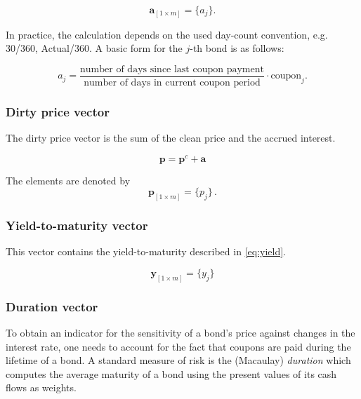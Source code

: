   \begin{equation*}\label{a}
\bm{a}_{\left[1\times m\right]}= \{a_j\}.
\end{equation*}


In practice, the calculation depends on the used day-count convention, e.g. 30/360, Actual/360. A basic form for the $j$-th bond is as follows:

\begin{equation*}
    a_j= \frac{\mbox{number of days since last coupon payment}}{\mbox{number of days in current coupon period}}\cdot \mbox{coupon}_j.
\end{equation*}
 	

\subsubsection*{Dirty price vector}

The dirty price vector is the sum of the clean price and the accrued interest.

\begin{displaymath}
\bm{p}=\bm{p}^c+\bm{a}
\end{displaymath}

The elements are denoted by 
\begin{equation*}\label{pd}
    \bm{p}_{\left[1\times m\right]}= \{p_j\}\,.
\end{equation*}


\subsubsection*{Yield-to-maturity vector}

This vector contains the yield-to-maturity described in \eqref{eq:yield}.

\begin{equation*}\label{pd}
    \bm{y}_{\left[1\times m\right]}= \{y_j\}
\end{equation*}



\subsubsection*{Duration vector}

To obtain an indicator for the sensitivity of a bond's price against changes in the interest rate, one needs to account for the fact that coupons are paid during the lifetime of a bond. A standard measure of risk is the (Macaulay) \emph{duration} which computes the average maturity of a bond using the present values of its cash flows as weights.



